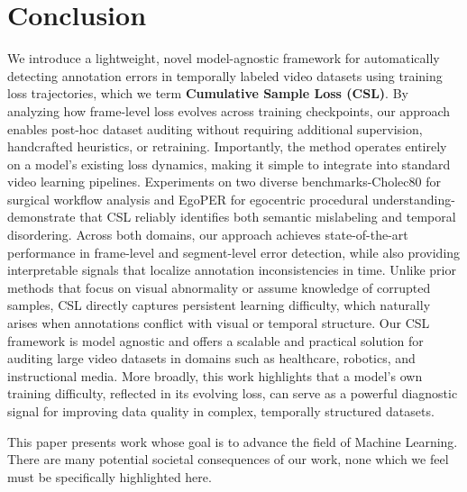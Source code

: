 \documentclass{article}
\theoremstyle{plain}
\theoremstyle{definition}
\theoremstyle{remark}
\begin{document}
\section{Conclusion}
\vspace{-0.2em}
We introduce a lightweight, novel model-agnostic framework for automatically detecting annotation errors in temporally labeled video datasets using training loss trajectories, which we term \textbf{Cumulative Sample Loss (CSL)}. By analyzing how frame-level loss evolves across training checkpoints, our approach enables post-hoc dataset auditing without requiring additional supervision, handcrafted heuristics, or retraining. Importantly, the method operates entirely on a model's existing loss dynamics, making it simple to integrate into standard video learning pipelines.
Experiments on two diverse benchmarks-Cholec80 for surgical workflow analysis and EgoPER for egocentric procedural understanding-demonstrate that CSL reliably identifies both semantic mislabeling and temporal disordering. Across both domains, our approach achieves state-of-the-art performance in frame-level and segment-level error detection, while also providing interpretable signals that localize annotation inconsistencies in time. Unlike prior methods that focus on visual abnormality or assume knowledge of corrupted samples, CSL directly captures persistent learning difficulty, which naturally arises when annotations conflict with visual or temporal structure. Our CSL framework is model agnostic and offers a scalable and practical solution for auditing large video datasets in domains such as healthcare, robotics, and instructional media. More broadly, this work highlights that a model's own training difficulty, reflected in its evolving loss, can serve as a powerful diagnostic signal for improving data quality in complex, temporally structured datasets.



This paper presents work whose goal is to advance the field of Machine Learning.
There are many potential societal consequences of our work, none which we feel
must be specifically highlighted here.

\end{document}
